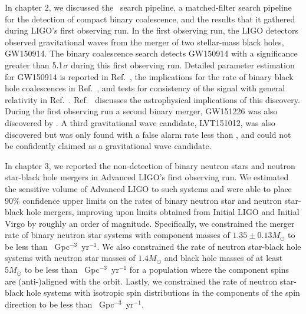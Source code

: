 
In chapter $2$, we discussed the \pycbc{}\ search pipeline, a matched-filter
search pipeline for the detection of compact binary coalescence, and the results
that it gathered during LIGO's first observing run. In the first observing run, the LIGO detectors observed
gravitational waves from the merger of two
stellar-mass black holes, GW150914. The binary coalescence search detects GW150914 with
a significance greater than $5.1$$\sigma$ during this first observing
run. Detailed parameter estimation for
GW150914 is reported in Ref.~\cite{GW150914-PARAMESTIM}, the implications for
the rate of binary black hole coalescences in Ref.~\cite{GW150914-RATES}, and
tests for consistency of the signal with general relativity in
Ref.~\cite{GW150914-TESTOFGR}.  Ref.~\cite{GW150914-ASTRO} discusses the
astrophysical implications of this discovery. During the first observing run
a second binary merger, GW151226 was also discovered by \pycbc{}\~\cite{Abbott:2016nmj}. A third
gravitational wave candidate, LVT151012, was also discovered but was only found
with a false alarm rate less than \CBCSECONDEVENTFAR, and could not be
confidently claimed as a gravitational wave candidate.

In chapter $3$, we reported the non-detection of binary neutron stars and neutron star-black hole mergers
in Advanced \ac{LIGO}'s first observing run.
We estimated the sensitive volume of Advanced \ac{LIGO} to such systems and were able to place 90\%
confidence upper limits on the rates of binary neutron star and neutron star-black hole mergers, improving upon limits
obtained from Initial \ac{LIGO} and Initial Virgo by roughly an order of magnitude.
Specifically, we constrained the merger rate of binary neutron star systems with component masses of $1.35\pm0.13M_{\odot}$
to be less than \MainBNSULPyCBCHighSpin~Gpc$^{-3}$~yr$^{-1}$. We also constrained
the rate of neutron star-black hole systems with neutron star masses of $1.4 M_\odot$ and black hole masses
of at least $5 M_{\odot}$ to be less than \MainNSBHULPyCBCFiveAligned~Gpc$^{-3}$~yr$^{-1}$
for a population where the component spins are (anti-)aligned with
the orbit. Lastly, we constrained the rate of neutron star-black hole systems with isotropic spin distributions in the
components of the spin direction to be less than \MainNSBHULPyCBCFiveIso~Gpc$^{-3}$~yr$^{-1}$.

